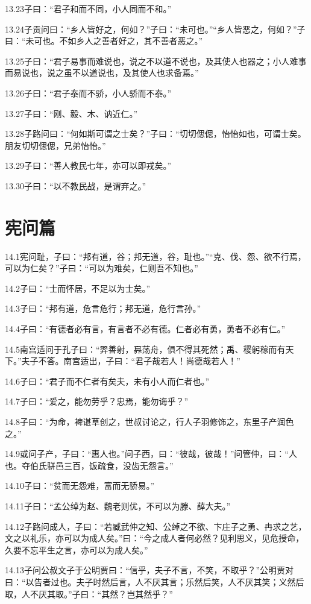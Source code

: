 \documentclass[a4paper,12pt,UTF8,twoside]{ctexbook}
\begin{document}
13.23子曰：“君子和而不同，小人同而不和。”

13.24子贡问曰：“乡人皆好之，何如？”子曰：“未可也。”“乡人皆恶之，何如？”子曰：“未可也。不如乡人之善者好之，其不善者恶之。”

13.25子曰：“君子易事而难说也，说之不以道不说也，及其使人也器之；小人难事而易说也，说之虽不以道说也，及其使人也求备焉。”

13.26子曰：“君子泰而不骄，小人骄而不泰。”

13.27子曰：“刚、毅、木、讷近仁。”

13.28子路问曰：“何如斯可谓之士矣？”子曰：“切切偲偲，怡怡如也，可谓士矣。朋友切切偲偲，兄弟怡怡。”

13.29子曰：“善人教民七年，亦可以即戎矣。”

13.30子曰：“以不教民战，是谓弃之。”

\chapter{宪问篇}

14.1宪问耻，子曰：“邦有道，谷；邦无道，谷，耻也。”“克、伐、怨、欲不行焉，可以为仁矣？”子曰：“可以为难矣，仁则吾不知也。”

14.2子曰：“士而怀居，不足以为士矣。”

14.3子曰：“邦有道，危言危行；邦无道，危行言孙。”

14.4子曰：“有德者必有言，有言者不必有德。仁者必有勇，勇者不必有仁。”

14.5南宫适问于孔子曰：“羿善射，奡荡舟，俱不得其死然；禹、稷躬稼而有天下。”夫子不答。南宫适出，子曰：“君子哉若人！尚德哉若人！”

14.6子曰：“君子而不仁者有矣夫，未有小人而仁者也。”

14.7子曰：“爱之，能勿劳乎？忠焉，能勿诲乎？”

14.8子曰：“为命，裨谌草创之，世叔讨论之，行人子羽修饰之，东里子产润色之。”

14.9或问子产，子曰：“惠人也。”问子西，曰：“彼哉，彼哉！”问管仲，曰：“人也。夺伯氏骈邑三百，饭疏食，没齿无怨言。”

14.10子曰：“贫而无怨难，富而无骄易。”

14.11子曰：“孟公绰为赵、魏老则优，不可以为滕、薛大夫。”

14.12子路问成人，子曰：“若臧武仲之知、公绰之不欲、卞庄子之勇、冉求之艺，文之以礼乐，亦可以为成人矣。”曰：“今之成人者何必然？见利思义，见危授命，久要不忘平生之言，亦可以为成人矣。”

14.13子问公叔文子于公明贾曰：“信乎，夫子不言，不笑，不取乎？”公明贾对曰：“以告者过也。夫子时然后言，人不厌其言；乐然后笑，人不厌其笑；义然后取，人不厌其取。”子曰：“其然？岂其然乎？”
\end{document}
